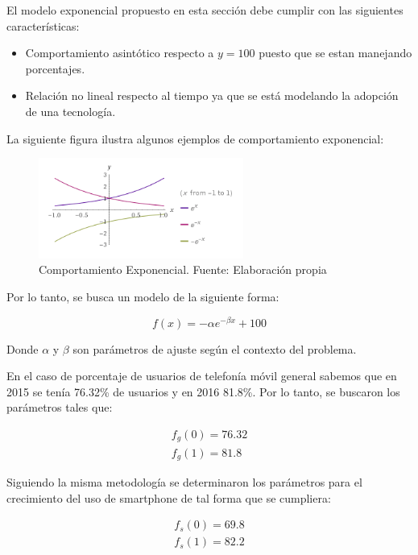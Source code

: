 \documentclass{article}
\begin{document}
El modelo exponencial propuesto en esta sección debe cumplir con las siguientes características:
\begin{itemize}
	\item Comportamiento asintótico respecto a $y=100$ puesto que se estan manejando porcentajes.
	\item Relación no lineal respecto al tiempo ya que se está modelando la adopción de una tecnología.
\end{itemize}

La siguiente figura ilustra algunos ejemplos de comportamiento exponencial:

	\begin{figure}[H]\centering
	\includegraphics[width=0.6\textwidth]{resources/img/modelo_exp.png}
	\caption{\label{fig:exponential_behaviour} Comportamiento Exponencial. Fuente: Elaboración propia}
    \end{figure}

Por lo tanto, se busca un modelo de la siguiente forma:

\begin{equation}
f(x) = -\alpha e^{-\beta x} + 100
\end{equation}

Donde $\alpha$ y $\beta$ son parámetros de ajuste según el contexto del problema.

En el caso de porcentaje de usuarios de telefonía móvil general sabemos que en 2015 se tenía 76.32\% de usuarios y
en 2016 81.8\%. Por lo tanto, se buscaron los parámetros tales que:

\begin{align*}
f_g(0) = 76.32 \\
f_g(1) = 81.8
\end{align*}

Siguiendo la misma metodología se determinaron los parámetros para el crecimiento del uso de smartphone de tal forma
que se cumpliera:

\begin{align*}
f_s(0) = 69.8 \\
f_s(1) = 82.2
\end{align*}
\end{document}
